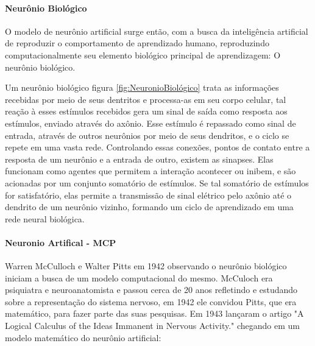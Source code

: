 \documentclass[	12pt, Times, openright, twoside, a4paper, english, brazil]{abntex2}
\begin{document}
          \paragraph*{Neurônio Biológico}
            O modelo de neurônio artificial surge então, com a busca da inteligência artificial de reproduzir o comportamento de aprendizado humano, reproduzindo computacionalmente seu elemento biológico principal de aprendizagem: O neurônio biológico. 
            \begin{figure}[H]
            \end{figure}
            Um neurônio biológico figura \ref{fig:NeuronioBiológico} trata as informações recebidas por meio de seus dentritos e processa-as em seu corpo celular, tal reação à esses estímulos recebidos gera um sinal de saída como resposta aos estímulos, enviado através do axônio. Esse estímulo é repassado como sinal de entrada, através de outros neurônios por meio de seus dendritos, e o ciclo se repete em uma vasta rede.
            Controlando essas conexões, pontos de contato entre a resposta de um neurônio e a entrada de outro, existem as sinapses. Elas funcionam como agentes que permitem a interação acontecer ou inibem, e são acionadas por um conjunto somatório de estímulos. Se tal somatório de estímulos for satisfatório, elas permite a transmissão de sinal elétrico pelo axônio até o dendrito de um neurônio vizinho, formando um ciclo de aprendizado em uma rede neural biológica.

          \paragraph*{Neuronio Artifical - MCP}
            Warren McCulloch e Walter Pitts em 1942 observando o neurônio biológico iniciam a busca de um modelo computacional do mesmo. McCuloch era psiquiatra e neuroanatomista e passou cerca de 20 anos refletindo e estudando sobre a representação do sistema nervoso, em 1942 ele convidou Pitts, que era matemático, para fazer parte das suas pesquisas. Em 1943 lançaram o artigo "A Logical Calculus of the Ideas Immanent in Nervous Activity." chegando em um modelo matemático do neurônio artificial: 
\end{document}
